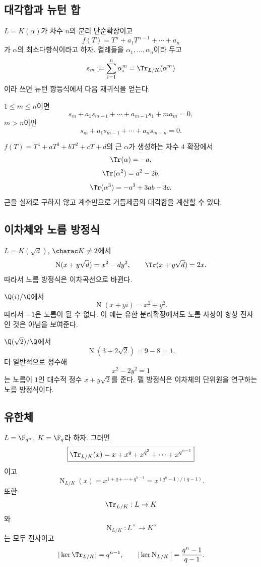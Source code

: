 \subsection{대각합과 뉴턴 합}

$L=K(\alpha)$가 차수 $n$의 분리 단순확장이고
\[
  f(T)=T^n+a_1T^{n-1}+\cdots+a_n
\]
가 $\alpha$의 최소다항식이라고 하자. 켤레들을 $\alpha_1,\dots,\alpha_n$이라 두고
\[
  s_m:=\sum_{i=1}^n\alpha_i^m
  =\Tr_{L/K}(\alpha^m)
\]
이라 쓰면 뉴턴 항등식에서 다음 재귀식을 얻는다.

\begin{proposition}[대각합의 뉴턴 재귀]
\label{prop:trace-newton-sums}
$1\le m\le n$이면
\[
  s_m+a_1s_{m-1}+\cdots+a_{m-1}s_1+ma_m=0,
\]
$m>n$이면
\[
  s_m+a_1s_{m-1}+\cdots+a_ns_{m-n}=0.
\]
\end{proposition}

\begin{example}
$f(T)=T^4+aT^3+bT^2+cT+d$의 근 $\alpha$가 생성하는 차수 $4$ 확장에서
\[
  \Tr(\alpha)=-a,
\]
\[
  \Tr(\alpha^2)=a^2-2b,
\]
\[
  \Tr(\alpha^3)=-a^3+3ab-3c.
\]
근을 실제로 구하지 않고 계수만으로 거듭제곱의 대각합을 계산할 수 있다.
\end{example}

\subsection{이차체와 노름 방정식}

$L=K(\sqrt d)$, $\charac K\ne2$에서
\[
  \operatorname N(x+y\sqrt d)=x^2-dy^2,
  \qquad
  \Tr(x+y\sqrt d)=2x.
\]
따라서 노름 방정식은 이차곡선으로 바뀐다.

\begin{example}
$\Q(i)/\Q$에서
\[
  \operatorname N(x+yi)=x^2+y^2.
\]
따라서 $-1$은 노름이 될 수 없다. 이 예는 유한 분리확장에서도 노름 사상이 항상 전사인 것은 아님을 보여준다.
\end{example}

\begin{example}
$\Q(\sqrt2)/\Q$에서
\[
  \operatorname N(3+2\sqrt2)=9-8=1.
\]
더 일반적으로 정수해
\[
  x^2-2y^2=1
\]
는 노름이 $1$인 대수적 정수 $x+y\sqrt2$를 준다. 펠 방정식은 이차체의 단위원을 연구하는 노름 방정식이다.
\end{example}

\subsection{유한체}

\begin{theorem}
\label{thm:finite-field-norm-trace}
$L=\F_{q^n}$, $K=\F_q$라 하자. 그러면
\[
  \boxed{
  \Tr_{L/K}(x)
  =x+x^q+x^{q^2}+\cdots+x^{q^{n-1}}}
\]
이고
\[
  \boxed{
  \operatorname N_{L/K}(x)
  =x^{1+q+\cdots+q^{n-1}}
  =x^{(q^n-1)/(q-1)}.}
\]
또한
\[
  \Tr_{L/K}:L\to K
\]
와
\[
  \operatorname N_{L/K}:L^\times\to K^\times
\]
는 모두 전사이고
\[
  |\ker\Tr_{L/K}|=q^{n-1},
  \qquad
  |\ker\operatorname N_{L/K}|
  =\frac{q^n-1}{q-1}.
\]
\end{theorem}

